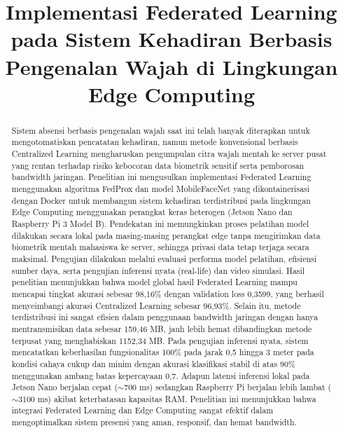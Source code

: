 \documentclass[conference]{IEEEtran}
\begin{document}
\title{Implementasi Federated Learning pada Sistem Kehadiran Berbasis Pengenalan Wajah di Lingkungan Edge Computing}

\author{
}

\maketitle

\begin{abstract}
Sistem absensi berbasis pengenalan wajah saat ini telah banyak diterapkan untuk mengotomatiskan pencatatan kehadiran, namun metode konvensional berbasis Centralized Learning mengharuskan pengumpulan citra wajah mentah ke server pusat yang rentan terhadap risiko kebocoran data biometrik sensitif serta pemborosan bandwidth jaringan. Penelitian ini mengusulkan implementasi Federated Learning menggunakan algoritma FedProx dan model MobileFaceNet yang dikontainerisasi dengan Docker untuk membangun sistem kehadiran terdistribusi pada lingkungan Edge Computing menggunakan perangkat keras heterogen (Jetson Nano dan Raspberry Pi 3 Model B). Pendekatan ini memungkinkan proses pelatihan model dilakukan secara lokal pada masing-masing perangkat edge tanpa mengirimkan data biometrik mentah mahasiswa ke server, sehingga privasi data tetap terjaga secara maksimal. Pengujian dilakukan melalui evaluasi performa model pelatihan, efisiensi sumber daya, serta pengujian inferensi nyata (real-life) dan video simulasi. Hasil penelitian menunjukkan bahwa model global hasil Federated Learning mampu mencapai tingkat akurasi sebesar 98,16\% dengan validation loss 0,3599, yang berhasil menyeimbangi akurasi Centralized Learning sebesar 96,93\%. Selain itu, metode terdistribusi ini sangat efisien dalam penggunaan bandwidth jaringan dengan hanya mentransmisikan data sebesar 159,46 MB, jauh lebih hemat dibandingkan metode terpusat yang menghabiskan 1152,34 MB. Pada pengujian inferensi nyata, sistem mencatatkan keberhasilan fungsionalitas 100\% pada jarak 0,5 hingga 3 meter pada kondisi cahaya cukup dan minim dengan akurasi klasifikasi stabil di atas 90\% menggunakan ambang batas kepercayaan 0,7. Adapun latensi inferensi lokal pada Jetson Nano berjalan cepat ($\sim$700 ms) sedangkan Raspberry Pi berjalan lebih lambat ($\sim$3100 ms) akibat keterbatasan kapasitas RAM. Penelitian ini menunjukkan bahwa integrasi Federated Learning dan Edge Computing sangat efektif dalam mengoptimalkan sistem presensi yang aman, responsif, dan hemat bandwidth.
\end{abstract}
\end{document}
